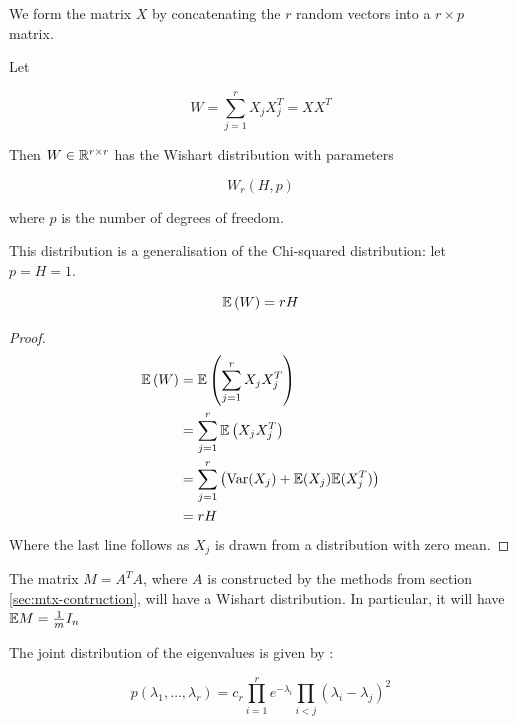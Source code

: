 \documentclass[12pt]{report}
\begin{document}
We form the matrix \(X\) by concatenating the \(r\) random vectors into a \(r \times p\) matrix.

\begin{definition}
Let 

\begin{equation}
W = \sum_{j=1}^r X_j X_j^T =  X X^T
\end{equation}

Then \(W \in {\mathbb{R}}^{r \times r}\) has the Wishart distribution with parameters 

\begin{equation}
W_r\left(H, p\right)
\end{equation}

where \(p\) is the number of degrees of freedom.
\end{definition}

\begin{remark}
This distribution is a generalisation of the Chi-squared distribution: let \(p = H = 1\). 
\end{remark}

\begin{theorem}
\begin{equation}
{\mathbb{E}}\left(W\right) = rH
\end{equation}
\end{theorem}
\begin{proof}
\begin{align*}
{\mathbb{E}}\left(W\right) &= {\mathbb{E}}\left(\sum_{j=1}^r X_j X_j^T\right) \\
&= \sum_{j=1}^r {\mathbb{E}}\left(X_jX_j^T\right) \\
&= \sum_{j=1}^r \left( \mathrm{Var}(X_j) + {\mathbb{E}}(X_j) {\mathbb{E}}(X_j^T)   \right) \\
&= rH 
\end{align*}
Where the last line follows as \(X_j\) is drawn from a distribution with zero mean.
\end{proof}

\begin{remark}
The matrix \(M = A^TA\), where \(A\) is constructed by the methods from section \ref{sec:mtx-contruction}, will have a Wishart distribution. In particular, it will have \({\mathbb{E}} M = \frac{1}{m}I_n\) 
\label{remark: exp AtA}
\end{remark}

The joint distribution of the eigenvalues is given by \cite{levequeMatrices}:

\begin{equation}
p\left(\lambda_1, \ldots, \lambda_r\right) = c_r \prod_{i=1}^r e^{-\lambda_i}\prod_{i<j}\left(\lambda_i - \lambda_j\right)^2
\end{equation}
\end{document}
